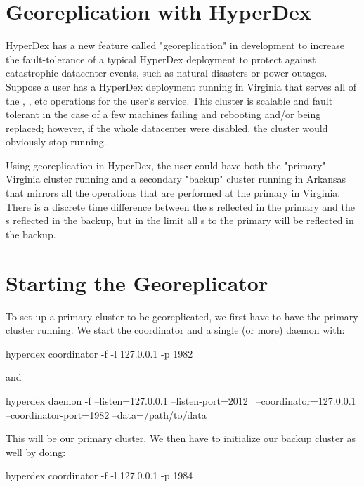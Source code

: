 \section{Georeplication with HyperDex}
\label{sec:georepl}

HyperDex has a new feature called "georeplication" in development to increase the
fault-tolerance of a typical HyperDex deployment to protect against catastrophic
datacenter events, such as natural disasters or power outages. Suppose a user
has a HyperDex deployment running in Virginia that serves all of the
, , etc operations for the user's service. This cluster
is scalable and fault tolerant in the case of a few machines failing and
rebooting and/or being replaced; however, if the whole datacenter were
disabled, the cluster would obviously stop running.

Using georeplication in HyperDex, the user could have both the
"primary" Virginia cluster running and a secondary "backup" cluster
running in Arkansas that mirrors all the  operations
that are performed at the primary in Virginia. There is a discrete
time difference between the s reflected in the primary
and the s reflected in the backup, but in the limit all
s to the primary will be reflected in the backup.

\section{Starting the Georeplicator}
\label{sec:startgeo}

To set up a primary cluster to be georeplicated, we first have to
have the primary cluster running. We start the coordinator
and a single (or more) daemon with:

\begin{consolecode}
hyperdex coordinator -f -l 127.0.0.1 -p 1982
\end{consolecode}

and

\begin{consolecode}
hyperdex daemon -f --listen=127.0.0.1 --listen-port=2012 \
                   --coordinator=127.0.0.1 --coordinator-port=1982 --data=/path/to/data
\end{consolecode}

This will be our primary cluster. We then have to initialize our backup cluster
as well by doing:

\begin{consolecode}
hyperdex coordinator -f -l 127.0.0.1 -p 1984
\end{consolecode}

